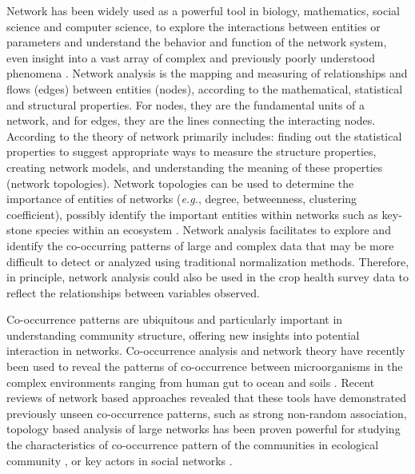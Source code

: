 Network has been widely used as a powerful tool in biology, mathematics, social science and computer science, to explore the interactions between entities or parameters \citep{Kasari_2011_Social, Proulx_2005_Network,  Barberan_2012_Network} and understand the behavior and function of the network system, even insight into a vast array of complex and previously poorly understood phenomena \citep{Newman_2003_Structure}. Network analysis is the mapping and measuring of relationships and flows (edges) between entities (nodes), according to the mathematical, statistical and structural properties. For nodes, they are the fundamental units of a network, and for edges, they are the lines connecting the interacting nodes.  According to \citet{Newman_2003_Structure} the theory of network primarily includes: finding out the statistical properties to suggest appropriate ways to measure the structure properties, creating network models, and understanding the meaning of these properties (network topologies). Network topologies can be used to determine the importance of entities of networks (\textit{e.g.}, degree, betweenness, clustering coefficient), possibly identify the important entities within networks such as key- stone species within an ecosystem \citep{Lu_2013_Soil, Borthagaray_2014_Inferring}. Network analysis facilitates to explore and identify the co-occurring patterns of large and complex data that may be more difficult to detect or analyzed using traditional normalization methods. Therefore, in principle, network analysis could also be used in the crop health survey data to reflect the relationships between variables observed. 

Co-occurrence patterns are ubiquitous and particularly important in understanding community structure, offering new insights into potential interaction in networks. Co-occurrence analysis and network theory have recently been used to reveal the patterns of co-occurrence between microorganisms in the complex environments ranging from human gut to ocean and soils \citep{Faust_2012_Microbial_co, Ma_2016_Geographic}. Recent reviews of network based approaches revealed that these tools have demonstrated previously unseen co-occurrence patterns, such as strong non-random association, topology based analysis of large networks has been proven powerful for studying the characteristics of co-occurrence pattern of the communities in ecological community \citep{Williams_2014_demonstrating, Barberan_2012_Network}, or key actors in social networks \citep{Crowston_2006_Hierarchy}. 

